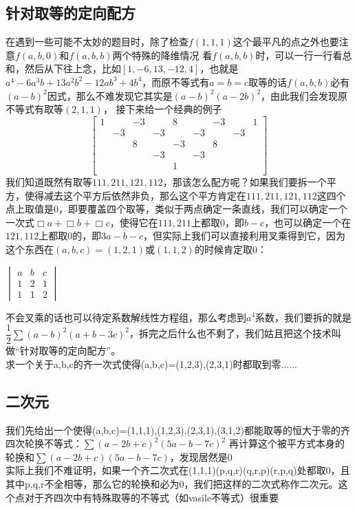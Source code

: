 \documentclass[UTF8]{ctexart}
\begin{document}
\subsection{针对取等的定向配方}
在遇到一些可能不太妙的题目时，除了检查$ f(1,1,1) $这个最平凡的点之外也要注意$ f(a,b,0) $和$ f(a,b,b) $两个特殊的降维情况
看$ f(a,b,b) $时，可以一行一行看总和，然后从下往上念，比如$ [1, -6, 13, -12, 4] $，也就是$ a^{4}-6a^{3}b+13a^{2}b^{2}-12ab^{3}+4b^{4} $，而原不等式有$ a=b=c $取等的话$ f(a,b,b) $必有$ (a-b)^{2} $因式，那么不难发现它其实是$ (a-b)^{2}(a-2b)^{2} $，由此我们会发现原不等式有取等$ (2,1,1) $，
接下来给一个经典的例子
\renewcommand*{\arraystretch}{1.732}\[
\left[\begin{matrix}
	1& &-3& &8& &-3& &1\\
	&-3& &-3& &-3& &-3&\\
	& &8& &-3& &8& &\\
	& & &-3& &-3& & &\\
	& & & &1& & & &\\
\end{matrix}\right]
\]
我们知道既然有取等$ 111,211,121,112 $，那该怎么配方呢？如果我们要拆一个平方，使得减去这个平方后依然非负，那么这个平方肯定在$ 111,211,121,112 $这四个点上取值是$ 0 $，即要覆盖四个取等，类似于两点确定一条直线，我们可以确定一个一次式$ \Box a+\Box b+\Box c $，使得它在$ 111,211 $上都取$ 0 $，即$ b-c $，也可以确定一个在$ 121,112 $上都取$ 0 $的，即$ 3a-b-c $，但实际上我们可以直接利用叉乘得到它，因为这个东西在$ (a,b,c)=(1,2,1) $或$ (1,1,2) $的时候肯定取$ 0 $：
\begin{center}
	$ \begin{vmatrix}
		a& b & c\\
		1& 2 & 1\\
		1& 1 & 2
	\end{vmatrix} $
\end{center}
不会叉乘的话也可以待定系数解线性方程组，那么考虑到$ a^{4} $系数，我们要拆的就是$\dfrac{1}{2} \displaystyle \sum (a-b)^{2}(a+b-3c)^{2} $，拆完之后什么也不剩了，我们姑且把这个技术叫做“针对取等的定向配方”。\\
求一个关于a,b,c的齐一次式使得(a,b,c)=(1,2,3),(2,3,1)时都取到零......\\
\subsection{二次元}
我们先给出一个使得(a,b,c)=(1,1,1),(1,2,3),(2,3,1),(3,1,2)都能取等的恒大于零的齐四次轮换不等式：$ \displaystyle \sum (a-2b+c)^{2}(5a-b-7c)^{2} $
再计算这个被平方式本身的轮换和$ \displaystyle \sum (a-2b+c)(5a-b-7c) $，发现居然是$ 0 $\\
实际上我们不难证明，如果一个齐二次式在(1,1,1)(p,q,r)(q,r,p)(r,p,q)处都取0，且其中p,q,r不全相等，那么它的轮换和必为0，我们把这样的二次式称作二次元。这个点对于齐四次中有特殊取等的不等式（如vasile不等式）很重要
\end{document}
